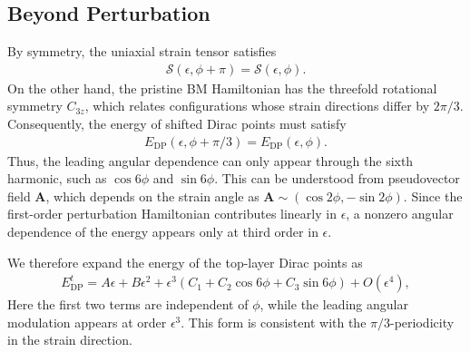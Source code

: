 \documentclass[10pt, oneside]{article}
\newcommand{\mr}[1]{\mathrm{#1}}
\newcommand{\p}[1]{\left(#1\right)}
\begin{document}



\subsection{Beyond Perturbation}

By symmetry, the uniaxial strain tensor satisfies
\begin{align}
	\mathcal S(\epsilon,\phi+\pi)=\mathcal S(\epsilon,\phi).
\end{align}
On the other hand, the pristine BM Hamiltonian has the threefold rotational symmetry \(C_{3z}\), which relates configurations whose strain directions differ by \(2\pi/3\). Consequently, the energy of shifted Dirac points must satisfy
\begin{align}
	E_{\mr{DP}}(\epsilon,\phi+\pi/3)
	=
	E_{\mr{DP}}(\epsilon,\phi).
\end{align}
Thus, the leading angular dependence can only appear through the sixth harmonic, such as \(\cos 6\phi\) and \(\sin 6\phi\). This can be understood from pseudovector field \(\bm{A}\), which depends on the strain angle as \(\bm{A} \sim (\cos 2\phi, -\sin 2\phi)\). Since the first-order perturbation Hamiltonian contributes linearly in \(\epsilon\), a nonzero angular dependence of the energy appears only at third order in \(\epsilon\).

We therefore expand the energy of the top-layer Dirac points as
\begin{align}
	E^{t}_{\mr{DP}}  = A \epsilon + B \epsilon^{2} + \epsilon^3 \p{C_1 + C_{2} \cos{6 \phi} + C_{3} \sin{6 \phi}} + O\p{\epsilon^{4}},
\end{align}
Here the first two terms are independent of \(\phi\), while the leading angular modulation appears at order \(\epsilon^3\). This form is consistent with the \(\pi/3\)-periodicity in the strain direction.
\end{document}

